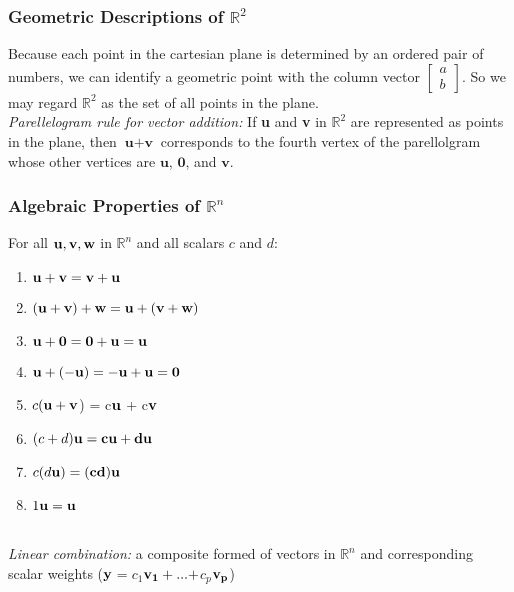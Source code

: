\documentclass[12pt]{article} %
\newcommand{\R}{\mathbb{R}}
\begin{document}
\subsubsection{Geometric Descriptions of $\R^2$}
Because each point in the cartesian plane is determined by an ordered pair of numbers, we can identify a geometric point with the column vector $\begin{bmatrix}a \\ b\end{bmatrix}$. So we may regard $\R^2$ as the set of all points in the plane.\\

\emph{Parellelogram rule for vector addition:} If \textbf{u} and \textbf{v} in $\R^2$ are represented as points in the plane, then $\textbf{u} + \textbf{v}$ corresponds to the fourth vertex of the parellolgram whose other vertices are $\textbf{u}$, $\textbf{0}$, and $\textbf{v}$.

\subsubsection{Algebraic Properties of $\R^n$}
For all $\bf{u}, \bf{v}, \bf{w}$ in $\R^n$ and all scalars $c$ and $d$:
\begin{enumerate}
	\item $\bf{u} + \bf{v} = \bf{v} + \bf{u}$
	\item $(\bf{u + v) + w = u + (v + w)}$
	\item $\bf{u + 0 = 0 + u = u}$
	\item $\bf{u + (-u) = -u + u = 0}$
	\item $c(\bf{u + v}$) = c$\bf{u}$ + c$\bf{v}$
	\item $(c + d)\bf{u} = c\bf{u} + d\bf{u}$
	\item $c(d\bf{u}) = (cd)\bf{u}$
	\item $1\bf{u = u}$
\end{enumerate}
\leavevmode \\
\emph{Linear combination:} a composite formed of vectors in $\R^n$ and corresponding scalar weights ($\bf{y}$$=c_1$$\bf{v_1+ ... + }$$c_p$$\bf{v_p}$)
\end{document}
